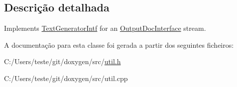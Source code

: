 \subsection{Descrição detalhada}
Implements \hyperlink{class_text_generator_intf}{Text\-Generator\-Intf} for an \hyperlink{class_output_doc_interface}{Output\-Doc\-Interface} stream. 

A documentação para esta classe foi gerada a partir dos seguintes ficheiros\-:\begin{DoxyCompactItemize}
\item 
C\-:/\-Users/teste/git/doxygen/src/\hyperlink{util_8h}{util.\-h}\item 
C\-:/\-Users/teste/git/doxygen/src/util.\-cpp\end{DoxyCompactItemize}

